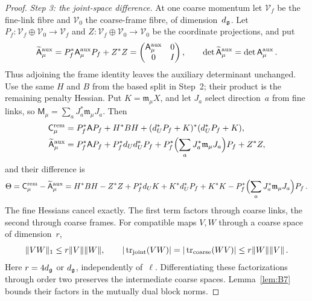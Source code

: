 \begin{proof}
\emph{Step 3: the joint-space difference.} At one coarse momentum let $\mathcal V_f$ be the fine-link fibre and $\mathcal V_0$ the coarse-frame fibre, of dimension~$d_{\mathfrak{g}}$. Let $P_f:\mathcal V_f\oplus\mathcal V_0\to\mathcal V_f$ and $Z:\mathcal V_f\oplus\mathcal V_0\to\mathcal V_0$ be the coordinate projections, and put
\begin{equation*}
\widetilde{\mathsf A}^{\rm aux}_\mu=P_f^*\mathsf A^{\rm aux}_\mu P_f+Z^*Z=
\begin{pmatrix}\mathsf A^{\rm aux}_\mu&0\\0&I\end{pmatrix},\qquad
\det\widetilde{\mathsf A}^{\rm aux}_\mu=\det\mathsf A^{\rm aux}_\mu\,.
\end{equation*}
Thus adjoining the frame identity leaves the auxiliary determinant unchanged. Use the same $H$ and $B$ from the based split in Step~2; their product is the remaining penalty Hessian. Put $K=\mathfrak m_\mu X$, and let $J_a$ select direction~$a$ from fine links, so $\mathsf M_\mu=\sum_aJ_a^*\mathfrak m_\mu J_a$. Then
\begin{align*}
\mathsf C^{\rm rem}_\mu&=P_f^*\mathsf AP_f+H^*BH+(d_U^*P_f+K)^*(d_U^*P_f+K),\\
\widetilde{\mathsf A}^{\rm aux}_\mu&=P_f^*\mathsf AP_f+P_f^*d_Ud_U^*P_f+
 P_f^*\Bigl(\sum_aJ_a^*\mathfrak m_\mu J_a\Bigr)P_f+Z^*Z,
\end{align*}
and their difference is
\begin{equation*}
\Theta=\mathsf C^{\rm rem}_\mu-\widetilde{\mathsf A}^{\rm aux}_\mu
=H^*BH-Z^*Z+P_f^*d_UK+K^*d_U^*P_f+K^*K
-P_f^*\Bigl(\sum_aJ_a^*\mathfrak m_\mu J_a\Bigr)P_f\,.
\end{equation*}
The fine Hessians cancel exactly. The first term factors through coarse links, the second through coarse frames. For compatible maps $V,W$ through a coarse space of dimension~$r$,
\begin{equation*}
\|VW\|_1\le r\|V\|\|W\|,\qquad
|\operatorname{tr}_{\rm joint}(VW)|=|\operatorname{tr}_{\rm coarse}(WV)|\le r\|W\|\|V\|\,.
\end{equation*}
Here $r=4d_{\mathfrak{g}}$ or $d_{\mathfrak{g}}$, independently of~$\ell$. Differentiating these factorizations through order two preserves the intermediate coarse spaces. Lemma~\ref{lem:B7} bounds their factors in the mutually dual block norms.


\end{proof}
